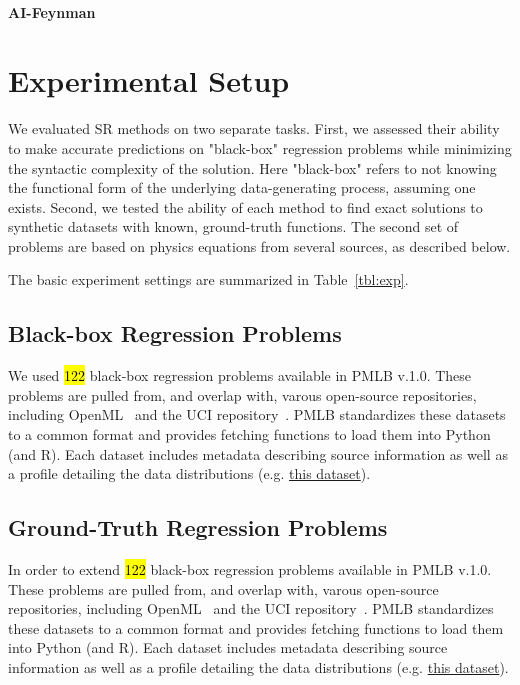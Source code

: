 \paragraph{AI-Feynman}

\section{Experimental Setup}

We evaluated SR methods on two separate tasks. 
First, we assessed their ability to make accurate predictions on "black-box" regression problems while minimizing the syntactic complexity of the solution. 
Here "black-box" refers to not knowing the functional form of the underlying data-generating process, assuming one exists.   
Second, we tested the ability of each method to find exact solutions to synthetic datasets with known, ground-truth functions. 
The second set of problems are based on physics equations from several sources, as described below. 

The basic experiment settings are summarized in Table~\ref{tbl:exp}.



\subsection{Black-box Regression Problems}

We used \hl{122} black-box regression problems available in PMLB v.1.0. 
These problems are pulled from, and overlap with, varous open-source repositories, including OpenML~\cite{vanschorenOpenMLNetworkedScience2013} and the UCI repository~\cite{lichmanUCIMachineLearning2013a}. 
PMLB standardizes these datasets to a common format and provides fetching functions to load them into Python (and R). 
Each dataset includes metadata describing source information as well as a profile detailing the data distributions (e.g. \href{https://epistasislab.github.io/pmlb/profile/analcatdata_aids.html}{this dataset}).


\subsection{Ground-Truth Regression Problems}
In order to extend \hl{122} black-box regression problems available in PMLB v.1.0. 
These problems are pulled from, and overlap with, varous open-source repositories, including OpenML~\cite{vanschorenOpenMLNetworkedScience2013} and the UCI repository~\cite{lichmanUCIMachineLearning2013a}. 
PMLB standardizes these datasets to a common format and provides fetching functions to load them into Python (and R). 
Each dataset includes metadata describing source information as well as a profile detailing the data distributions (e.g. \href{https://epistasislab.github.io/pmlb/profile/analcatdata_aids.html}{this dataset}).

